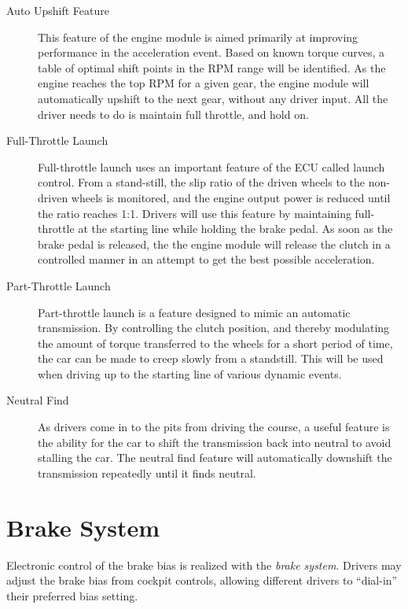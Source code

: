 \begin{description}

\item[Auto Upshift Feature]
This feature of the engine module is aimed primarily at improving performance in the acceleration event. Based on known torque curves, a table of optimal shift points in the RPM range will be identified. As the engine reaches the top RPM for a given gear, the engine module will automatically upshift to the next gear, without any driver input. All the driver needs to do is maintain full throttle, and hold on.

\item[Full-Throttle Launch]
Full-throttle launch uses an important feature of the ECU called launch control. From a stand-still, the slip ratio of the driven wheels to the non-driven wheels is monitored, and the engine output power is reduced until the ratio reaches 1:1. Drivers will use this feature by maintaining full-throttle at the starting line while holding the brake pedal. As soon as the brake pedal is released, the the engine module will release the clutch in a controlled manner in an attempt to get the best possible acceleration.

\item[Part-Throttle Launch]
Part-throttle launch is a feature designed to mimic an automatic transmission. By controlling the clutch position, and thereby modulating the amount of torque transferred to the wheels for a short period of time, the car can be made to creep slowly from a standstill. This will be used when driving up to the starting line of various dynamic events.

\item[Neutral Find]
As drivers come in to the pits from driving the course, a useful feature is the ability for the car to shift the transmission back into neutral to avoid stalling the car. The neutral find feature will automatically downshift the transmission repeatedly until it finds neutral.

\end{description}

%
%

\section{Brake System}

Electronic control of the brake bias is realized with the \emph{brake system}. Drivers may adjust the brake bias from cockpit controls, allowing different drivers to {}``dial-in'' their preferred bias setting. 

